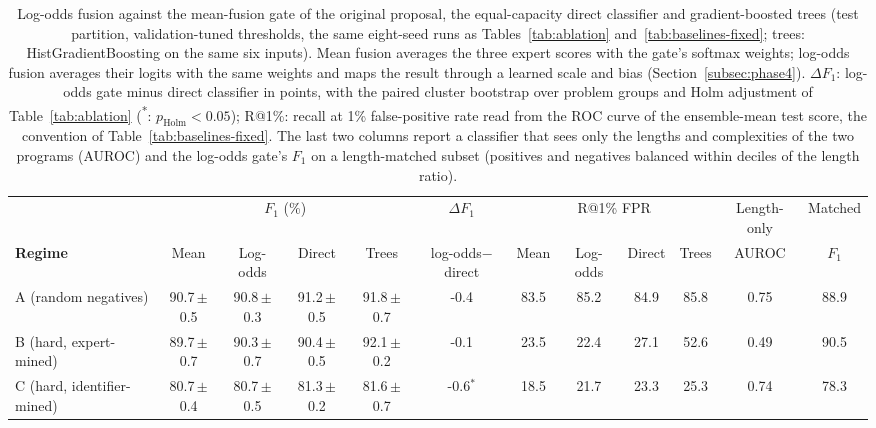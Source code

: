 \begin{table}[t]
\centering
\caption{Log-odds fusion against the mean-fusion gate of the original proposal, the equal-capacity direct classifier and gradient-boosted trees (test partition, validation-tuned thresholds, the same eight-seed runs as Tables~\ref{tab:ablation} and~\ref{tab:baselines-fixed}; trees: HistGradientBoosting on the same six inputs). Mean fusion averages the three expert scores with the gate's softmax weights; log-odds fusion averages their logits with the same weights and maps the result through a learned scale and bias (Section~\ref{subsec:phase4}). $\Delta F_1$: log-odds gate minus direct classifier in points, with the paired cluster bootstrap over problem groups and Holm adjustment of Table~\ref{tab:ablation} (\textsuperscript{*}: $p_{\text{Holm}}<0.05$); R@1\%: recall at 1\% false-positive rate read from the ROC curve of the ensemble-mean test score, the convention of Table~\ref{tab:baselines-fixed}. The last two columns report a classifier that sees only the lengths and complexities of the two programs (AUROC) and the log-odds gate's $F_1$ on a length-matched subset (positives and negatives balanced within deciles of the length ratio).}
\label{tab:logit-bench}
\footnotesize
\setlength{\tabcolsep}{3pt}
\begin{tabular}{l|cccc|c|cccc|cc}
\toprule
 & \multicolumn{4}{c|}{$F_1$ (\%)} & $\Delta F_1$ & \multicolumn{4}{c|}{R@1\% FPR} & Length-only & Matched \\
\textbf{Regime} & Mean & Log-odds & Direct & Trees & log-odds$-$direct & Mean & Log-odds & Direct & Trees & AUROC & $F_1$ \\
\midrule
A (random negatives) & 90.7\,{\scriptsize$\pm$0.5} & 90.8\,{\scriptsize$\pm$0.3} & 91.2\,{\scriptsize$\pm$0.5} & 91.8\,{\scriptsize$\pm$0.7} & -0.4 & 83.5 & 85.2 & 84.9 & 85.8 & 0.75 & 88.9 \\
B (hard, expert-mined) & 89.7\,{\scriptsize$\pm$0.7} & 90.3\,{\scriptsize$\pm$0.7} & 90.4\,{\scriptsize$\pm$0.5} & 92.1\,{\scriptsize$\pm$0.2} & -0.1 & 23.5 & 22.4 & 27.1 & 52.6 & 0.49 & 90.5 \\
C (hard, identifier-mined) & 80.7\,{\scriptsize$\pm$0.4} & 80.7\,{\scriptsize$\pm$0.5} & 81.3\,{\scriptsize$\pm$0.2} & 81.6\,{\scriptsize$\pm$0.7} & -0.6$^{*}$ & 18.5 & 21.7 & 23.3 & 25.3 & 0.74 & 78.3 \\
\bottomrule
\end{tabular}
\end{table}